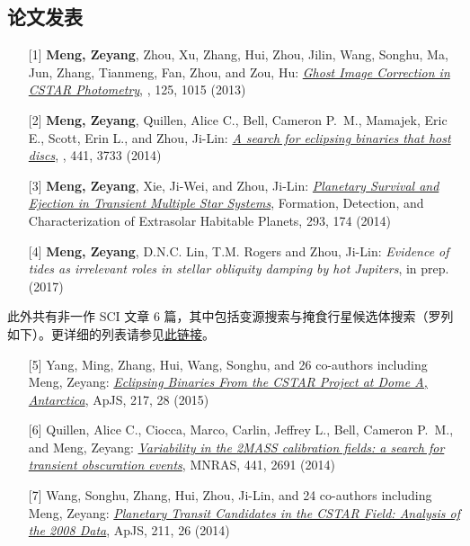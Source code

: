 \begin{resume}
\begin{cv}{}
\subsection*{论文发表} 
\begin{itemize}
\item[{[1]}] \textbf{Meng, Zeyang}, Zhou, Xu, Zhang, Hui, Zhou, Jilin, Wang, Songhu, Ma, Jun, Zhang, Tianmeng, Fan, Zhou, and Zou, Hu:  \href{http://adsabs.harvard.edu/abs/2013PASP..125.1015M}{\textit{Ghost Image Correction in CSTAR Photometry}}, \pasp, 125, 1015 (2013) 
\item[{[2]}] \textbf{Meng, Zeyang}, Quillen, Alice C., Bell, Cameron P.~M., Mamajek, Eric E., Scott, Erin L., and Zhou, Ji-Lin:  \href{http://adsabs.harvard.edu/abs/2014MNRAS.441.3733M}{\textit{A search for eclipsing binaries that host discs}}, \mnras, 441, 3733 (2014)  
\item[{[3]}] \textbf{Meng, Zeyang}, Xie, Ji-Wei, and Zhou, Ji-Lin:  \href{http://adsabs.harvard.edu/abs/2014IAUS..293..174M}{\textit{Planetary Survival and Ejection in Transient Multiple Star Systems}}, Formation, Detection, and Characterization of Extrasolar Habitable Planets, 293, 174 (2014) 
\item[{[4]}] \textbf{Meng, Zeyang}, D.N.C. Lin, T.M. Rogers and Zhou, Ji-Lin:  \textit{Evidence of tides as irrelevant roles in stellar obliquity damping by hot Jupiters}, in prep.  (2017)
\end{itemize}
此外共有非一作 SCI 文章 6 篇，其中包括变源搜索与掩食行星候选体搜索（罗列如下）。更详细的列表请参见\href{https://www.researchgate.net/profile/Zeyang_Meng/publications}{此链接}。
\begin{itemize}
\item[{[5]}] Yang, Ming, Zhang, Hui, Wang, Songhu, and 26 co-authors including Meng, Zeyang:  \href{http://adsabs.harvard.edu/abs/2015ApJS..217...28Y}{\textit{Eclipsing Binaries From the CSTAR Project at Dome A, Antarctica}}, ApJS, 217, 28 (2015) 
\item[{[6]}]  Quillen, Alice C., Ciocca, Marco, Carlin, Jeffrey L., Bell, Cameron P.~M., and Meng, Zeyang:  \href{http://adsabs.harvard.edu/abs/2014MNRAS.441.2691Q}{\textit{Variability in the 2MASS calibration fields: a search for transient obscuration events}}, MNRAS, 441, 2691 (2014) 
\item[{[7]}]  Wang, Songhu, Zhang, Hui, Zhou, Ji-Lin, and 24 co-authors including Meng, Zeyang:  \href{http://adsabs.harvard.edu/abs/2014ApJS..211...26W}{\textit{Planetary Transit Candidates in the CSTAR Field: Analysis of the 2008 Data}}, ApJS, 211, 26 (2014) 
\end{itemize}
\vfill
{}
\end{cv}

\end{resume}